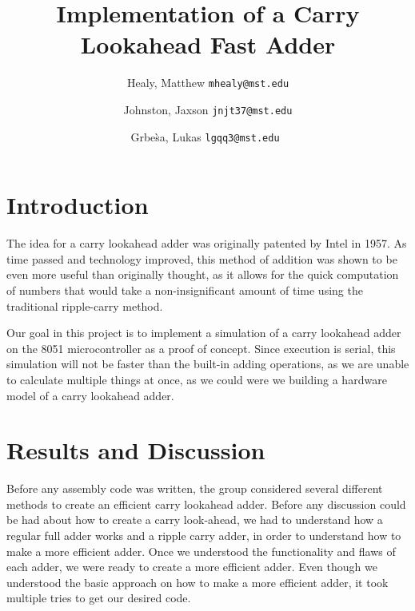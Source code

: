 \documentclass[journal]{IEEEtran}
\begin{document}
\title{Implementation of a Carry Lookahead Fast Adder}
\author{
	Healy, Matthew
	\texttt{mhealy@mst.edu}\\
	\and
	Johnston, Jaxson
	\texttt{jnjt37@mst.edu}\\
	\and
	Grbe\`sa, Lukas
	\texttt{lgqq3@mst.edu}\
}

\maketitle


\begin{abstract}

\end{abstract}

\section{Introduction}\label{sec:intro}
The idea for a carry lookahead adder was originally patented by Intel in 1957.
As time passed and technology improved, this method of addition was shown
to be even more useful than originally thought, as it allows for the quick
computation of numbers that would take a non-insignificant amount of time
using the traditional ripple-carry method.

Our goal in this project is to implement a simulation of a carry lookahead
adder on the 8051 microcontroller as a proof of concept. Since execution is
serial, this simulation will not be faster than the built-in adding operations,
as we are unable to calculate multiple things at once, as we could were we
building a hardware model of a carry lookahead adder.

\section{Results and Discussion}\label{sec:discuss}

Before any assembly code was written, the group considered several different
methods to create an efficient carry lookahead adder. Before any discussion
could be had about how to create a carry look-ahead, we had to understand
how a regular full adder works and a ripple carry adder, in order to
understand how to make a more efficient adder. Once we understood the
functionality and flaws of each adder, we were ready to create a more
efficient adder. Even though we understood the basic approach on how to
make a more efficient adder, it took multiple tries to get our desired code.
\end{document}
